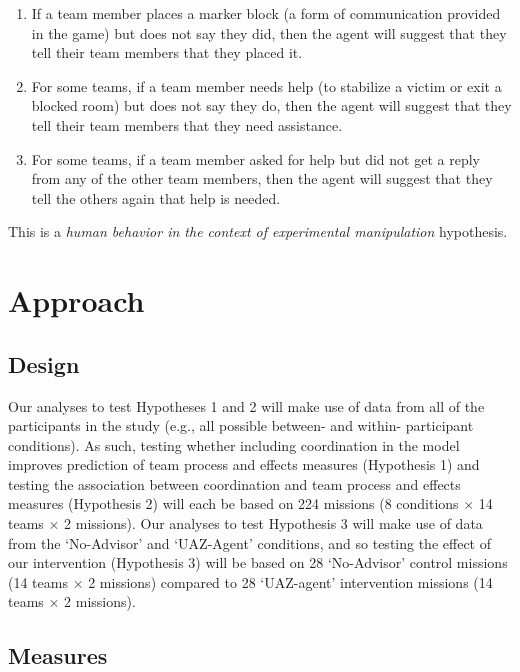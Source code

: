 \begin{enumerate}
    \item If a team member places a marker block (a form of communication
        provided in the game) but does not say they did, then the agent
        will suggest that they tell their team members that they placed it. 

    \item For some teams, if a team member needs help (to stabilize a
        victim or exit a blocked room) but does not say they do, then the
        agent will suggest that they tell their team members that they need
        assistance. 

    \item For some teams, if a team member asked for help but did not get a
        reply from any of the other team members, then the agent will
        suggest that they tell the others again that help is needed. 
\end{enumerate}

\noindent This is a
\textit{human behavior in the context of experimental manipulation} hypothesis.

\section{Approach}

\subsection{Design}

Our analyses to test Hypotheses 1 and 2 will make use of data from all of the
participants in the study (e.g., all possible between- and within- participant
conditions). As such, testing whether including coordination in the model
improves prediction of team process and effects measures (Hypothesis 1) and
testing the association between coordination and team process and effects
measures (Hypothesis 2) will each be based on 224 missions (8 conditions
$\times$ 14 teams $\times$ 2 missions). Our analyses to test Hypothesis 3 will
make use of data from the `No-Advisor' and `UAZ-Agent' conditions, and so
testing the effect of our intervention (Hypothesis 3) will be based on 28
`No-Advisor' control missions (14 teams $\times$ 2 missions) compared to 28
`UAZ-agent' intervention missions (14 teams $\times$ 2 missions).

\subsection{Measures}
\label{subsec:measures}

